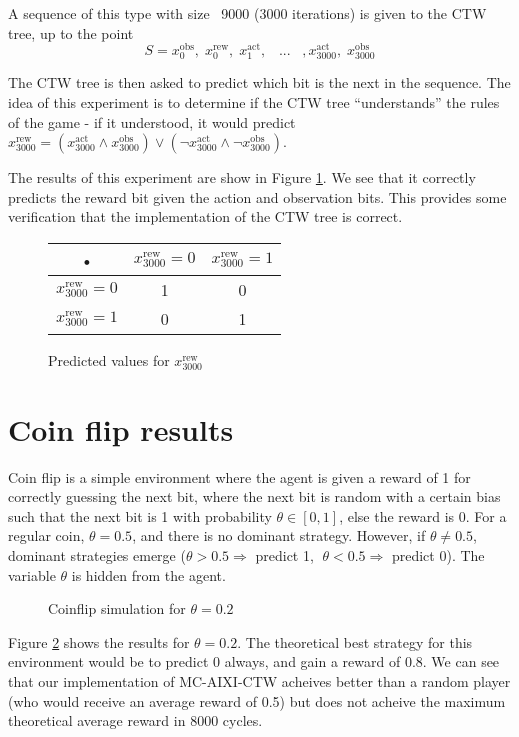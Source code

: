 \documentclass[pdftex,twoside,a4paper]{report}
\newcommand{\bcen}{\begin{center}}
\newcommand{\ecen}{\end{center}}
\newcommand{\mac}{MC-AIXI-CTW}
\begin{document}
A sequence of this type with size ~9000 (3000 iterations) is given to the CTW tree, up to the point
\[
S = x^{\text{obs}}_0,\; x^{\text{rew}}_0,\; x^{\text{act}}_1,\;\;\;...\;\;\;,x^{\text{act}}_{3000},\;x^{\text{obs}}_{3000}
\]

The CTW tree is then asked to predict which bit is the next in the sequence. The idea of this experiment is to determine if the CTW tree ``understands'' the rules of the game - if it understood, it would predict $x^{\text{rew}}_{3000} = (x^{\text{act}}_{3000} \land x^{\text{obs}}_{3000}) \lor (\lnot x^{\text{act}}_{3000} \land \lnot x^{\text{obs}}_{3000})$.

The results of this experiment are show in Figure \ref{tab:non_det_seq_pred}. We see that it correctly predicts the reward bit given the action and observation bits. This provides some verification that the implementation of the CTW tree is correct.
\begin{figure}
\bcen
\bgroup
\def\arraystretch{1.5}
\begin{tabular}{c |c| c }
 • & $x^{\text{rew}}_{3000} = 0$ & $x^{\text{rew}}_{3000} = 1$ \\ 
\hline $x^{\text{rew}}_{3000} = 0$ & 1 & 0 \\ 
\hline $x^{\text{rew}}_{3000} = 1$ & 0 & 1 \\  
\end{tabular}
\egroup
\ecen
\caption{Predicted values for $x^{\text{rew}}_{3000}$}
\label{tab:non_det_seq_pred}
\end{figure}

\section{Coin flip results}
Coin flip is a simple environment where the agent is given a reward of 1 for correctly guessing the next bit, where the next bit is random with a certain bias such that the next bit is 1 with probability $\theta \in [0,1]$, else the reward is 0. For a regular coin, $\theta = 0.5$, and there is no dominant strategy. However, if $\theta \not = 0.5$, dominant strategies emerge ($\theta > 0.5 \Rightarrow $ predict 1, $\; \theta < 0.5 \Rightarrow $ predict 0). The variable $\theta$ is hidden from the agent.
\begin{figure}
\centering
\caption{Coinflip simulation for $\theta=0.2$}
\label{fig:coin_0_2}
\end{figure}
Figure \ref{fig:coin_0_2} shows the results for $\theta=0.2$. The theoretical best strategy for this environment would be to predict $0$ always, and gain a reward of $0.8$. We can see that our implementation of \mac{} acheives better than a random player (who would receive an average reward of 0.5) but does not acheive the maximum theoretical average reward in 8000 cycles.
\end{document}
